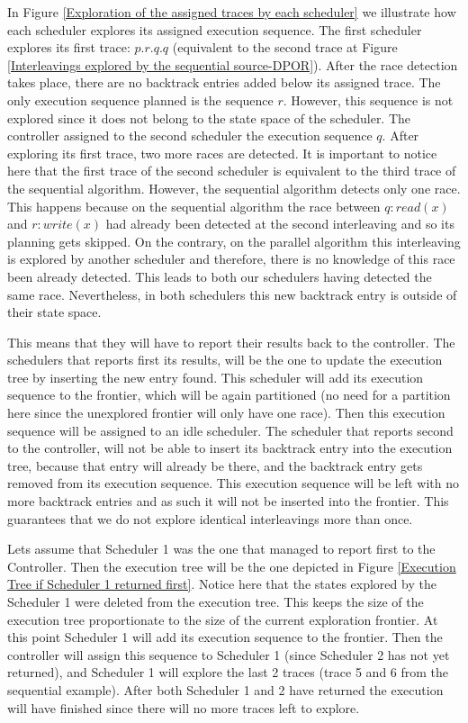 
In Figure \ref{Exploration of the assigned traces by each scheduler} we illustrate how each scheduler explores its assigned 
execution sequence. The first scheduler explores its first trace: $p.r.q.q$ (equivalent to the second trace 
at Figure \ref{Interleavings explored by the sequential source-DPOR}). After the race detection takes place,
there are no backtrack entries added below its assigned trace. The only execution sequence planned is the sequence $r$. However,
this sequence is not explored since it does not belong to the state space of the scheduler. The controller assigned to the
second scheduler the execution sequence $q$. After exploring its first trace, two more races are detected. It is important to notice
here that the first trace of the second scheduler is equivalent to the third trace of the sequential algorithm. However,
the sequential algorithm detects only one race. This happens because on the sequential algorithm the race between $q: read(x)$ and
$r:write(x)$ had already been detected at the second interleaving and so its planning gets skipped. 
On the contrary, on the parallel algorithm this interleaving
is explored by another scheduler and therefore, there is no knowledge of this race been already detected. This leads to
both our schedulers having detected the same race. Nevertheless, in both schedulers this new backtrack entry is outside of their
state space. 

This means that they will have to report their results back to the controller. The schedulers that reports first its results, 
will be the one to update the execution tree by inserting the new entry found. This
scheduler will add its execution sequence to the frontier, which will be again partitioned
(no need for a partition here since the unexplored frontier will only have one race). Then this execution sequence will be
assigned to an idle scheduler. The scheduler that reports second to the controller, will not be able to insert its 
backtrack entry into the execution tree, because that entry will already be there, and the backtrack entry gets removed
from its execution sequence. This execution sequence will be left with no more backtrack entries and as such it will not be
inserted into the frontier. This guarantees that we do not explore identical interleavings more than once.

Lets assume that Scheduler 1 was the one that managed to report first to the Controller. Then the execution tree will be the one
depicted in Figure \ref{Execution Tree if Scheduler 1 returned first}. Notice here that the states explored by the Scheduler 1
were deleted from the execution tree. This keeps the size of the execution tree proportionate to the size of 
the current exploration frontier. At this point Scheduler 1 will add its execution sequence to the frontier. Then the 
controller will assign this sequence to Scheduler 1 (since Scheduler 2 has not yet returned), and Scheduler 1 will explore
the last 2 traces (trace 5 and 6 from the sequential example). After both Scheduler 1 and 2 have returned the execution 
will have finished since there will no more traces left to explore.


